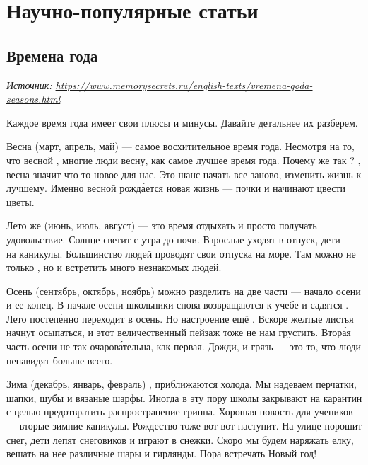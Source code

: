 \chapter{Научно-популярные статьи}

\section{Времена года}
\textit{Источник: \url{https://www.memorysecrets.ru/english-texts/vremena-goda-seasons.html}}

Каждое время года имеет свои плюсы и минусы. Давайте детальнее их разберем.

Весна (март, апрель, май) --- самое восхитительное время года. Несмотря на то, что весной  , многие люди  весну, как самое лучшее время года. Почему же так ? , весна значит что-то новое для нас. Это шанс начать все заново, изменить жизнь к лучшему. Именно весной рожд\'{а}ется новая жизнь ---  почки и начинают цвести цветы.

Лето же (июнь, июль, август) --- это время отдыхать и просто получать удовольствие. Солнце светит с утра до ночи. Взрослые уходят в отпуск, дети --- на каникулы. Большинство людей проводят свои отпуска на море. Там можно не только , но и встретить много незнакомых людей.

Осень (сентябрь, октябрь, ноябрь) можно разделить на две части --- начало осени и ее конец. В начале осени школьники снова возвращаются к учебе и садятся . Лето постеп\'{е}нно переходит в осень. Но настроение ещё . Вскоре желтые листья начнут осыпаться, и этот величественный пейзаж тоже не  нам грустить. Втор\'{а}я часть осени не так очаров\'{а}тельна, как первая. Дожди,  и грязь --- это то, что люди ненавидят больше всего.

Зима (декабрь, январь, февраль) , приближаются холода. Мы надеваем перчатки, шапки, шубы и вязаные шарфы. Иногда в эту пору школы закрывают на карантин с целью предотвратить распространение гриппа. Хорошая новость для учеников --- вторые зимние каникулы. Рождество тоже вот-вот наступит. На улице порошит снег, дети лепят снеговиков и играют в снежки. Скоро мы будем наряжать елку, вешать на нее различные шары и гирлянды. Пора встречать Новый год!

